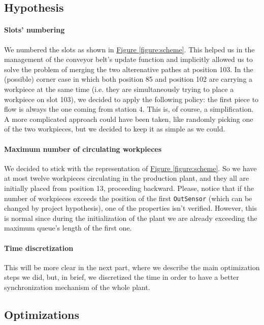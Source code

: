 \documentclass[a4paper]{article}
\newcommand{\figureref}[1]{\textsf{\hyperref[#1]{Figure \ref*{#1}}}}
\begin{document}
    \subsection{Hypothesis}

    \paragraph{Slots' numbering} We numbered the slots as shown in \figureref{figure:scheme}. This helped us in the management of the conveyor belt's update function and implicitly allowed us to solve the problem of merging the two alterenative pathes at position 103. In the (possible) corner case in which both position 85 and position 102 are carrying a workpiece at the same time (i.e. they are simultaneously trying to place a workpiece on slot 103), we decided to apply the following policy: the first piece to flow is always the one coming from station 4. This is, of course, a simplification. A more complicated approach could have been taken, like randomly picking one of the two workpieces, but we decided to keep it as simple as we could.

    \paragraph{Maximum number of circulating workpieces} We decided to stick with the representation of \figureref{figure:scheme}. So we have at most twelve workpieces circulating in the production plant, and they all are initially placed from position 13, proceeding backward. Please, notice that if the number of workpieces exceeds the position of the first \texttt{OutSensor} (which can be changed by project hypothesis), one of the properties isn't verified. However, this is normal since during the initialization of the plant we are already exceeding the maximum queue's length of the first one.

    \paragraph{Time discretization} This will be more clear in the next part, where we describe the main optimization steps we did, but, in brief, we discretized the time in order to have a better synchronization mechanism of the whole plant.

    \subsection{Optimizations}
\end{document}

